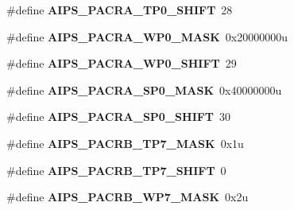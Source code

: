 \begin{DoxyCompactItemize}
\item 
\#define {\bfseries A\+I\+P\+S\+\_\+\+P\+A\+C\+R\+A\+\_\+\+T\+P0\+\_\+\+S\+H\+I\+FT}~28\hypertarget{group__AIPS__Register__Masks_ga14b0fbe8a5d4d3c2c687090698f4d307}{}\label{group__AIPS__Register__Masks_ga14b0fbe8a5d4d3c2c687090698f4d307}

\item 
\#define {\bfseries A\+I\+P\+S\+\_\+\+P\+A\+C\+R\+A\+\_\+\+W\+P0\+\_\+\+M\+A\+SK}~0x20000000u\hypertarget{group__AIPS__Register__Masks_gab0dbe95e59c91126a667fc20a0d1f061}{}\label{group__AIPS__Register__Masks_gab0dbe95e59c91126a667fc20a0d1f061}

\item 
\#define {\bfseries A\+I\+P\+S\+\_\+\+P\+A\+C\+R\+A\+\_\+\+W\+P0\+\_\+\+S\+H\+I\+FT}~29\hypertarget{group__AIPS__Register__Masks_ga452355a55a160bcfb7e17f060569d0b8}{}\label{group__AIPS__Register__Masks_ga452355a55a160bcfb7e17f060569d0b8}

\item 
\#define {\bfseries A\+I\+P\+S\+\_\+\+P\+A\+C\+R\+A\+\_\+\+S\+P0\+\_\+\+M\+A\+SK}~0x40000000u\hypertarget{group__AIPS__Register__Masks_ga11109b3502f454b24cff8a1de4f0c5eb}{}\label{group__AIPS__Register__Masks_ga11109b3502f454b24cff8a1de4f0c5eb}

\item 
\#define {\bfseries A\+I\+P\+S\+\_\+\+P\+A\+C\+R\+A\+\_\+\+S\+P0\+\_\+\+S\+H\+I\+FT}~30\hypertarget{group__AIPS__Register__Masks_ga7a99d46f8a65968fe1ec041bb24e4643}{}\label{group__AIPS__Register__Masks_ga7a99d46f8a65968fe1ec041bb24e4643}

\item 
\#define {\bfseries A\+I\+P\+S\+\_\+\+P\+A\+C\+R\+B\+\_\+\+T\+P7\+\_\+\+M\+A\+SK}~0x1u\hypertarget{group__AIPS__Register__Masks_ga61f0e0ca0fc547d6d16b82b809ec68e6}{}\label{group__AIPS__Register__Masks_ga61f0e0ca0fc547d6d16b82b809ec68e6}

\item 
\#define {\bfseries A\+I\+P\+S\+\_\+\+P\+A\+C\+R\+B\+\_\+\+T\+P7\+\_\+\+S\+H\+I\+FT}~0\hypertarget{group__AIPS__Register__Masks_ga74127c75240a56d4ab6fc6ec9e9c3e3d}{}\label{group__AIPS__Register__Masks_ga74127c75240a56d4ab6fc6ec9e9c3e3d}

\item 
\#define {\bfseries A\+I\+P\+S\+\_\+\+P\+A\+C\+R\+B\+\_\+\+W\+P7\+\_\+\+M\+A\+SK}~0x2u\hypertarget{group__AIPS__Register__Masks_ga529288b923e8b8681636ae6c62b68f6b}{}\label{group__AIPS__Register__Masks_ga529288b923e8b8681636ae6c62b68f6b}


\end{DoxyCompactItemize}

